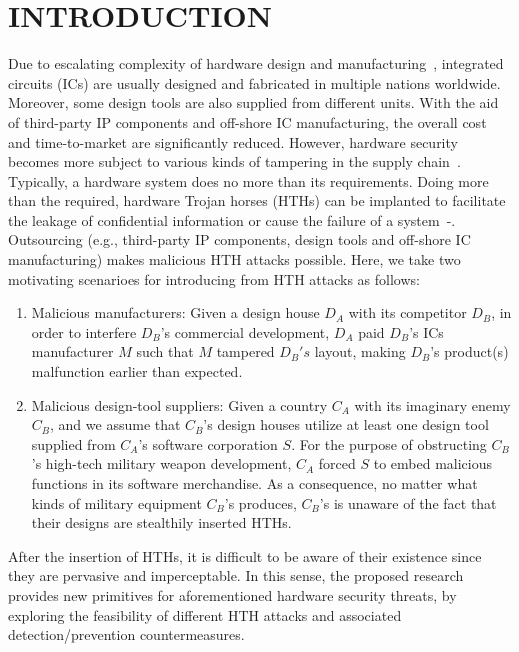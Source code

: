 \section{INTRODUCTION}
Due to escalating complexity of hardware design and manufacturing~\cite{wilson2013international}, integrated circuits (ICs) are usually designed and fabricated in multiple nations worldwide. Moreover, some design tools are also supplied from different units. With the aid of third-party IP components and off-shore IC manufacturing, the overall cost and time-to-market are significantly reduced. However, hardware security becomes more subject to various kinds of tampering in the supply chain~\cite{tehranipoor2011trustworthy}\cite{karri2010trustworthy}. Typically, a hardware system does no more than its requirements. Doing more than the required, hardware Trojan horses (HTHs) can be implanted to facilitate the leakage of confidential information or cause the failure of a system~\cite{adee2008hunt}-\cite{bhunia2014hardware}. Outsourcing (e.g., third-party IP components, design tools and off-shore IC manufacturing) makes malicious HTH attacks possible. Here, we take two motivating scenarioes for introducing from HTH attacks as follows:
\begin{enumerate}[leftmargin=*]
	\item Malicious manufacturers: Given a design house $D_{A}$ with its competitor $D_{B}$, in order to interfere $D_{B}$'s commercial development, $D_{A}$ paid $D_{B}$'s ICs manufacturer $M$ such that $M$ tampered $D_{B}'s$ layout, making $D_{B}$'s product(s) malfunction earlier than expected.
	\item Malicious design-tool suppliers: Given a country $C_{A}$ with its imaginary enemy $C_{B}$, and we assume that $C_{B}$'s design houses utilize at least one design tool supplied from $C_{A}$'s software corporation $S$. For the purpose of obstructing $C_{B}$'s high-tech military weapon development, $C_{A}$ forced $S$ to embed malicious functions in its software merchandise. As a consequence, no matter what kinds of military equipment $C_{B}$'s produces, $C_{B}$'s is unaware of the fact that their designs are stealthily inserted HTHs.
\end{enumerate}
After the insertion of HTHs, it is difficult to be aware of their existence since they are pervasive and imperceptable. In this sense, the proposed research provides new primitives for aforementioned hardware security threats, by exploring the feasibility of different HTH attacks and associated detection/prevention countermeasures.

